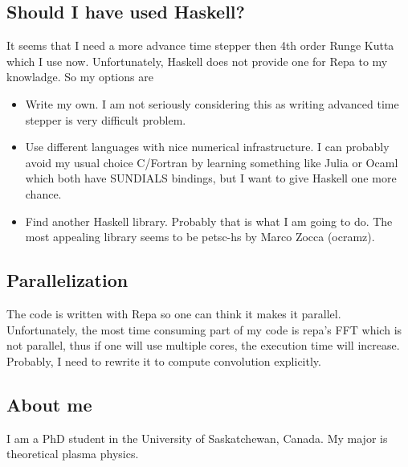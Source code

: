 \documentclass[preprint,aip,pop]{article}
\begin{document}
\subsection{Should I have used Haskell?}
It seems that I need a more advance time stepper then 4th order Runge Kutta
which I use now. Unfortunately, Haskell does not provide one for Repa to my
knowladge. So my options are
\begin{itemize}
\item Write my own. I am not seriously considering this as writing advanced
  time stepper is very difficult problem.
 \item Use different languages with nice numerical infrastructure. I can
   probably avoid my usual choice C/Fortran by learning something like Julia or
   Ocaml which both have SUNDIALS bindings, but I want to give Haskell one more chance.
 \item Find another Haskell library. Probably that is what I am going to do. The
   most appealing library seems to be petsc-hs by Marco Zocca (ocramz).
\end{itemize}
\subsection{Parallelization}
The code is written with Repa so one can think it makes it parallel.
Unfortunately, the most time consuming part of my code is repa's FFT which is
not parallel, thus if one will use multiple cores, the execution time will increase.
Probably, I need to rewrite it to compute convolution explicitly.
\subsection{About me}
I am a PhD student in the University of Saskatchewan, Canada. My major is
theoretical plasma physics. 
\end{document}
